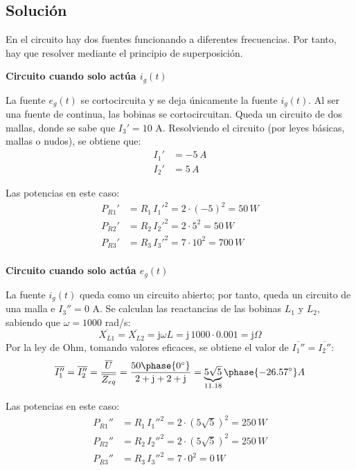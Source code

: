 \subsection*{Solución}

En el circuito hay dos fuentes funcionando a diferentes frecuencias. Por tanto, hay que resolver mediante el principio de superposición.

\textbf{Circuito cuando solo actúa $i_g(t)$}
    
La fuente $e_g(t)$ se cortocircuita y se deja únicamente la fuente
$i_g(t)$. Al ser una fuente de continua, las bobinas se
cortocircuitan. Queda un circuito de dos mallas, donde se sabe que
$I_3'=10$ A. Resolviendo el circuito (por leyes básicas, mallas o
nudos), se obtiene que:
\begin{align*}
  I_1'&=-5\,A\\
  I_2'&=5\,A
\end{align*}
    
Las potencias en este caso:
\begin{align*}
  P_{R1}'&=R_1\,I_1'^2=2\cdot (-5)^2=50\,W\\
  P_{R2}'&=R_2\,I_2'^2=2\cdot 5^2=50\,W\\
  P_{R3}'&=R_3\,I_3'^2=7\cdot 10^2=700\,W\\
\end{align*}
    
\textbf{Circuito cuando solo actúa $e_g(t)$}
    
La fuente $i_g(t)$ queda como un circuito abierto; por tanto, queda un
circuito de una malla e $I_3''=0$ A. Se calculan las reactancias de
las bobinas $L_1$ y $L_2$, sabiendo que $\omega=1000$ rad/s:
\begin{equation*}
  \overline{X_{L1}}=\overline{X_{L2}}=\mathrm{j}\omega L=\mathrm{j}\, 1000\cdot 0.001 = \mathrm{j}\Omega
\end{equation*}
Por la ley de Ohm, tomando valores eficaces, se obtiene el valor de
$\overline{I_1''}=\overline{I_2''}$:
\begin{equation*}
  \overline{I_1''}=\overline{I_2''}=\dfrac{\overline{U}}{\overline{Z_{eq}}}=\dfrac{50\phase{0^\circ}}{2+\mathrm{j}+2+\mathrm{j}}=\underbrace{5\sqrt{5}}_{11.18}\phase{-26.57^\circ} A
\end{equation*}
    
Las potencias en este caso:
\begin{align*}
  P_{R1}''&=R_1\,I_1''^2=2\cdot (5\sqrt{5})^2=250\,W\\
  P_{R2}''&=R_2\,I_2''^2=2\cdot (5\sqrt{5})^2=250\,W\\
  P_{R3}''&=R_3\,I_3''^2=7\cdot 0^2=0\,W\\
\end{align*}
    
